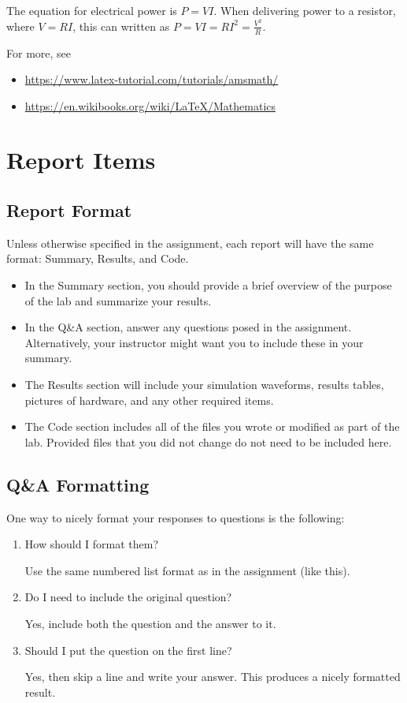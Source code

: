 \documentclass[11pt]{article}
\begin{document}
The equation for electrical power is $P = VI$.  When delivering power to a resistor, where $V = RI$, this can written as $P = VI = RI^2 = \frac{V^2}{R}$.

For more, see
\begin{itemize}
	\item \url{https://www.latex-tutorial.com/tutorials/amsmath/}
	\item \url{https://en.wikibooks.org/wiki/LaTeX/Mathematics}
\end{itemize}



\section*{Report Items}

\subsection*{Report Format}
Unless otherwise specified in the assignment, each report will have the same format: Summary, Results, and Code. 
\begin{itemize}
	\item In the Summary section, you should provide a brief overview of the purpose of the lab and summarize your results. 
	\item In the Q\&A section, answer any questions posed in the assignment.  Alternatively, your instructor might want you to include these in your summary.
	\item The Results section will include your simulation waveforms, results tables, pictures of hardware, and any other required items.  
	\item The Code section includes all of the files you wrote or modified as part of the lab.  Provided files that you did not change do not need to be included here.
\end{itemize}

\subsection*{Q\&A Formatting}
One way to nicely format your responses to questions is the following:

\begin{enumerate}
	\item How should I format them?
	
	Use the same numbered list format as in the assignment (like this).
	
	\item Do I need to include the original question?
	
	Yes, include both the question and the answer to it.
	
	\item Should I put the question on the first line?
	
	Yes, then skip a line and write your answer.  This produces a nicely formatted result.
\end{enumerate}
\end{document}
